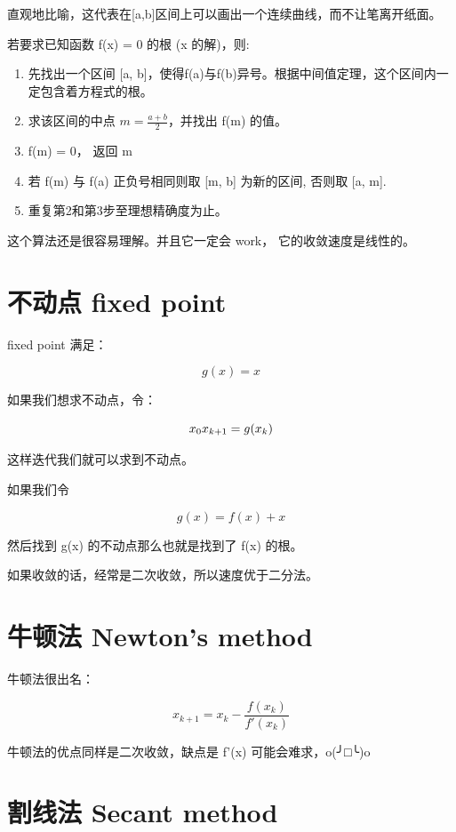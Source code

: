 \documentclass[
]{book}
\providecommand{\tightlist}{%
  \setlength{\itemsep}{0pt}\setlength{\parskip}{0pt}}
\begin{document}
直观地比喻，这代表在{[}a,b{]}区间上可以画出一个连续曲线，而不让笔离开纸面。

若要求已知函数 f(x) = 0 的根 (x 的解)，则:

\begin{enumerate}
\def\labelenumi{\arabic{enumi}.}
\tightlist
\item
  先找出一个区间 {[}a, b{]}，使得f(a)与f(b)异号。根据中间值定理，这个区间内一定包含着方程式的根。
\item
  求该区间的中点 \(m={\frac {a+b}{2}}\)，并找出 f(m) 的值。
\item
  f(m) = 0， 返回 m
\item
  若 f(m) 与 f(a) 正负号相同则取 {[}m, b{]} 为新的区间, 否则取 {[}a, m{]}.
\item
  重复第2和第3步至理想精确度为止。
\end{enumerate}

这个算法还是很容易理解。并且它一定会 work， 它的收敛速度是线性的。

\hypertarget{ux4e0dux52a8ux70b9-fixed-point}{%
\section{不动点 fixed point}\label{ux4e0dux52a8ux70b9-fixed-point}}

fixed point 满足：

\[
g(x) = x
\]

如果我们想求不动点，令：

\[
x_0 \\
x_{k+1} = g(x_k)
\]

这样迭代我们就可以求到不动点。

如果我们令

\[
g(x) = f(x) + x 
\]

然后找到 g(x) 的不动点那么也就是找到了 f(x) 的根。

如果收敛的话，经常是二次收敛，所以速度优于二分法。

\hypertarget{ux725bux987fux6cd5-newtons-method}{%
\section{牛顿法 Newton's method}\label{ux725bux987fux6cd5-newtons-method}}

牛顿法很出名：

\[
x_{k+1} = x_k - \frac{f(x_k)}{f'(x_k)}
\]

牛顿法的优点同样是二次收敛，缺点是 f'(x) 可能会难求，o(╯□╰)o

\hypertarget{ux5272ux7ebfux6cd5-secant-method}{%
\section{割线法 Secant method}\label{ux5272ux7ebfux6cd5-secant-method}}
\end{document}
